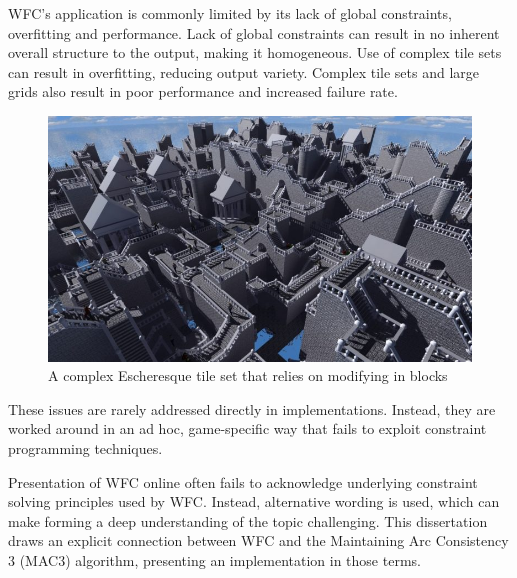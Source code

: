 WFC's application is commonly limited by its lack of global constraints, overfitting and performance. Lack of global constraints can result in no inherent overall structure to the output, making it homogeneous. Use of complex tile sets can result in overfitting, reducing output variety. Complex tile sets and large grids also result in poor performance and increased failure rate.

\begin{figure}[H]
        \centering
        \includegraphics[width=\textwidth, height=0.3\textheight, keepaspectratio]{Images/escher_sample-768x445.jpg}
        \caption{A complex Escheresque tile set that relies on modifying in blocks \cite{model_synthesis_diss}}
        \label{fig:escheresque}
\end{figure}

These issues are rarely addressed directly in implementations. Instead, they are worked around in an ad hoc, game-specific way that fails to exploit constraint programming techniques.

Presentation of WFC online often fails to acknowledge underlying constraint solving principles used by WFC. Instead, alternative wording is used, which can make forming a deep understanding of the topic challenging. This dissertation draws an explicit connection between WFC and the Maintaining Arc Consistency 3 (MAC3) algorithm, presenting an implementation in those terms.

